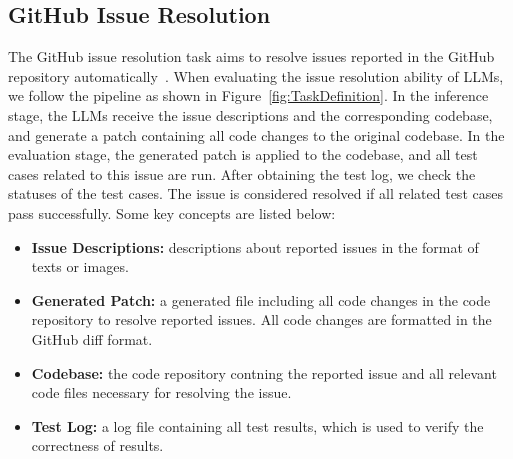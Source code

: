 \subsection{GitHub Issue Resolution}
The GitHub issue resolution task aims to resolve issues reported in the GitHub repository automatically~\cite{jimenez2023swe,zan2024swe}. %
When evaluating the issue resolution ability of LLMs, %
we follow the pipeline as shown in Figure~\ref{fig:TaskDefinition}. In the inference stage, the LLMs receive the issue descriptions and the corresponding codebase, and generate a patch containing all code changes to the original codebase. In the evaluation stage, the generated patch is applied to the codebase, and all test cases related to this issue are run. After obtaining the test log, we check the statuses of the test cases. The issue is considered resolved if all related test cases pass successfully. Some key concepts are listed below:

\begin{itemize}%
    \item \textbf{Issue Descriptions:} descriptions about reported issues in the format of texts or images. 
    \item \textbf{Generated Patch:} a generated file including all code changes in the code repository to resolve reported issues. All code changes are formatted in the GitHub diff format.
    \item \textbf{Codebase:} the code repository contning the reported issue and all relevant code files necessary for resolving the issue.
    \item \textbf{Test Log:} a log file containing all test results, which is used to verify the correctness of results.
\end{itemize}






